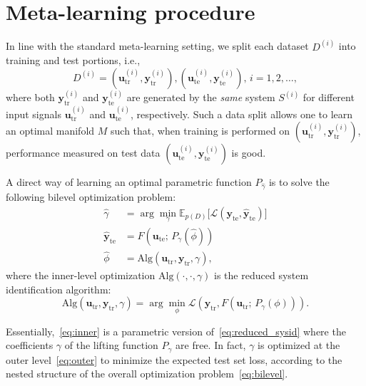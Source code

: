 \documentclass{article}
\newcommand{\ii}{{(i)}}
\newcommand{\tr}{\mathrm{tr}}
\newcommand{\te}{\mathrm{te}}
\newcommand{\seq}[1]{{\mathbf{#1}}}
\newcommand{\E}{\mathbb{E}}
\newcommand{\loss}{\mathcal{L}}
\newcommand{\redpar}{\phi}
\newcommand{\projpar}{\gamma}
\newcommand{\M}{F}
\begin{document}
\section{Meta-learning procedure}
\label{sec:reduced_order}
In line with the standard meta-learning setting, we split each dataset
$D^\ii$ into training and test portions, i.e.,
\begin{equation}
\label{eq:dataset_stream_split}
D^\ii = (\seq{u}^\ii_\tr , \seq{y}^\ii_\tr ), (\seq{u}^\ii_\te , \seq{y}^\ii_\te ),\, i=1,2,\dots,
\end{equation}
where both $\seq{y}^\ii_\tr$ and $\seq{y}^\ii_\te$ are generated by the \emph{same} system $S^\ii$ for different input signals $\seq{u}^\ii_\tr$ and $\seq{u}^\ii_\te$, respectively.
Such a data split
allows one to learn an optimal manifold $M$ such that, when training is performed on $(\seq{u}^\ii_\tr , \seq{y}^\ii_\tr )$, performance measured on test data
$(\seq{u}^\ii_\te , \seq{y}^\ii_\te )$ is good.

A direct way of learning an optimal parametric function $P_{\hat \projpar}$ is to solve the following bilevel optimization problem:
\begin{subequations}
\label{eq:bilevel}
\begin{align}
\hat \projpar &= \arg \min_{\projpar} \E_{p(D)}
\big [ \loss({\seq y}_\te, \hat {\seq y}_\te) \big ] \label{eq:outer}\\
\hat{\seq{y}}_\te  &= \M\left(
  \seq{u}_\te ; \,
  P_{\projpar} ( \hat \redpar  )
\right)\\
   \hat \redpar &=
   \mathrm{Alg}(\seq u_\tr , \seq y_\tr, \projpar),\label{eq:inner}
\end{align}
\end{subequations}
where the inner-level optimization $\mathrm{Alg}(\cdot, \cdot, \projpar)$ is the reduced system identification algorithm:
\begin{equation}
\mathrm{Alg} (\seq u_\tr , \seq y_\tr, \projpar ) =
\arg \min_\redpar \loss(\seq y_\tr, \M(\seq u_\tr ; \, P_\projpar(\redpar))).
\end{equation}

Essentially,~\eqref{eq:inner} is a parametric version of~\eqref{eq:reduced_sysid} where the coefficients $\projpar$ of the lifting function $P_\projpar$ are free. In fact, $\projpar$ is optimized at the outer level~\eqref{eq:outer} to minimize the expected test set loss, according to the nested structure of the overall optimization problem~\eqref{eq:bilevel}.
\end{document}
